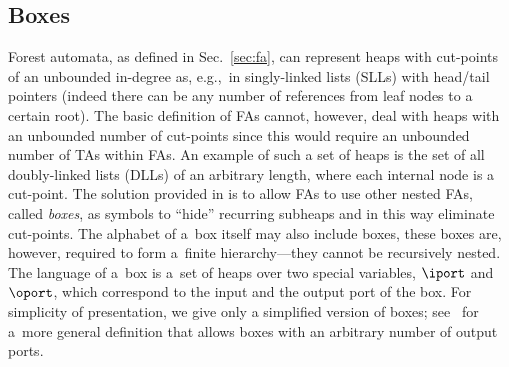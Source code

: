 {\subsection{Boxes}\label{sec:boxes}
Forest automata, as defined in Sec.~\ref{sec:fa}, can represent heaps with
cut-points of an unbounded in-degree as,
e.g.,~in singly-linked lists (SLLs) with head/tail pointers (indeed there can be any number of
references from leaf nodes to a certain root).
The basic definition of FAs cannot, however, deal with
heaps with an unbounded number of cut-points since this would require
an unbounded number of TAs within FAs.
An example of such a set of heaps is the
set of all doubly-linked lists (DLLs) of an arbitrary length, where each internal node is a cut-point.
The solution provided in \cite{forester12} is to allow FAs to use
other nested FAs, called \emph{boxes}, as symbols to ``hide'' recurring
subheaps 
and in this way eliminate
cut-points. The alphabet of a~box itself may also include boxes, these
boxes are, however, required to form a~finite hierarchy---they cannot be recursively nested.
The language of a~box is a~set of heaps over two special variables, $\iport$
and $\oport$, which correspond to the input and the output port of the box.
For simplicity of presentation, we give only a simplified version of boxes;
see~\cite{forester12} for a~more general definition that allows boxes with an
arbitrary number of output ports.


}
